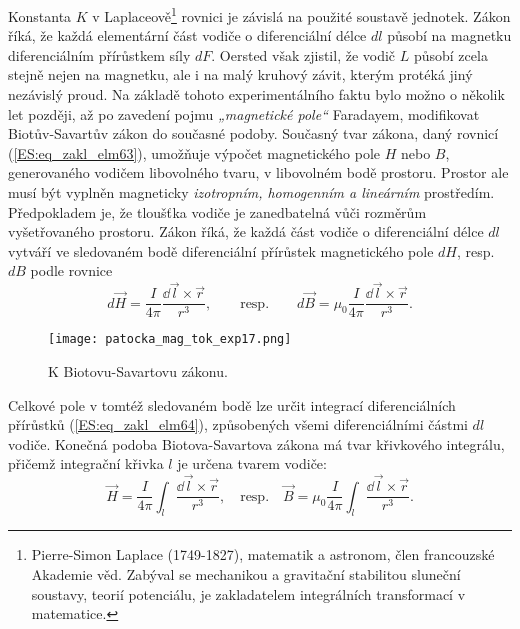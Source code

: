     Konstanta \(K\) v Laplaceově\footnote{Pierre-Simon Laplace (1749-1827), matematik a astronom, 
    člen francouzské Akademie věd. Zabýval se mechanikou a gravitační stabilitou sluneční soustavy, 
    teorií potenciálu, je zakladatelem integrálních transformací v matematice.} rovnici je závislá 
    na použité soustavě jednotek. Zákon říká, že každá elementární část vodiče o diferenciální 
    délce \(dl\) působí na magnetku diferenciálním přírůstkem síly \(dF\). Oersted však zjistil, že 
    vodič \(L\) působí zcela stejně nejen na magnetku, ale i na malý kruhový závit, kterým protéká 
    jiný nezávislý proud. Na základě tohoto experimentálního faktu bylo možno o několik let 
    později, až po zavedení pojmu \emph{„magnetické pole“} Faradayem, modifikovat Biotův-Savartův 
    zákon do současné podoby. Současný tvar zákona, daný rovnicí (\ref{ES:eq_zakl_elm63}), umožňuje 
    výpočet magnetického pole \(H\) nebo \(B\), generovaného vodičem libovolného tvaru, v 
    libovolném bodě prostoru. Prostor ale musí být vyplněn magneticky \emph{izotropním, homogenním 
    a lineárním} prostředím. Předpokladem je, že tloušťka vodiče je zanedbatelná vůči rozměrům 
    vyšetřovaného prostoru. Zákon říká, že každá část vodiče o diferenciální délce \(dl\) vytváří 
    ve sledovaném bodě diferenciální přírůstek magnetického pole \(dH\), resp. \(dB\) podle rovnice
    \begin{equation}\label{ES:eq_zakl_elm64}
      d\vec{H} = \frac{I}{4\pi}\frac{\dd{\vec{l}}\times \vec{r}}{r^3}, \qquad\text{resp.}\qquad
      d\vec{B} = \mu_0\frac{I}{4\pi}\frac{\dd{\vec{l}}\times \vec{r}}{r^3}.
    \end{equation}     
    \begin{figure}[ht!]
      \centering
      \texttt{[image: patocka\_mag\_tok\_exp17.png]}
      \caption{K Biotovu-Savartovu zákonu.}
      \label{es:fig_patocka_mag_tok_exp17}
    \end{figure}
    Celkové pole v tomtéž sledovaném bodě lze určit integrací diferenciálních přírůstků 
    (\ref{ES:eq_zakl_elm64}), způsobených všemi diferenciálními částmi \(dl\) vodiče. Konečná 
    podoba Biotova-Savartova zákona má tvar křivkového integrálu, přičemž integrační křivka \(l\) 
    je určena tvarem vodiče:
    \begin{equation}\label{ES:eq_zakl_elm65}
      \vec{H} = \frac{I}{4\pi}\int_l\frac{\dd{\vec{l}}\times \vec{r}}{r^3}, \quad\text{resp.}\quad
      \vec{B} = \mu_0\frac{I}{4\pi}\int_l\frac{\dd{\vec{l}}\times \vec{r}}{r^3}.
    \end{equation} 
    
